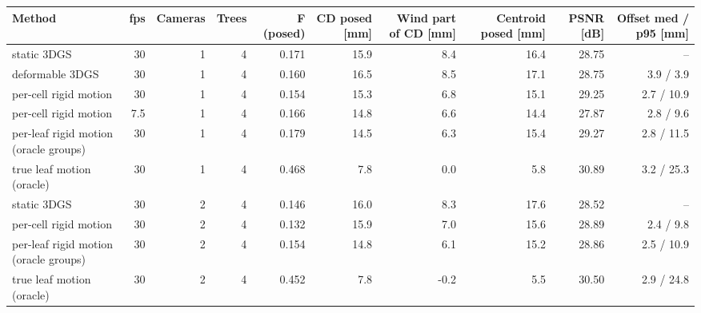 \begin{tabular}{lrrrrrrrrr}
\toprule
Method & fps & Cameras & Trees & F (posed) & CD posed [mm] & Wind part of CD [mm] & Centroid posed [mm] & PSNR [dB] & Offset med / p95 [mm] \\
\midrule
static 3DGS & 30 & 1 & 4 & 0.171 & 15.9 & 8.4 & 16.4 & 28.75 & -- \\
deformable 3DGS & 30 & 1 & 4 & 0.160 & 16.5 & 8.5 & 17.1 & 28.75 & 3.9 / 3.9 \\
per-cell rigid motion & 30 & 1 & 4 & 0.154 & 15.3 & 6.8 & 15.1 & 29.25 & 2.7 / 10.9 \\
per-cell rigid motion & 7.5 & 1 & 4 & 0.166 & 14.8 & 6.6 & 14.4 & 27.87 & 2.8 / 9.6 \\
per-leaf rigid motion (oracle groups) & 30 & 1 & 4 & 0.179 & 14.5 & 6.3 & 15.4 & 29.27 & 2.8 / 11.5 \\
true leaf motion (oracle) & 30 & 1 & 4 & 0.468 & 7.8 & 0.0 & 5.8 & 30.89 & 3.2 / 25.3 \\
\midrule
static 3DGS & 30 & 2 & 4 & 0.146 & 16.0 & 8.3 & 17.6 & 28.52 & -- \\
per-cell rigid motion & 30 & 2 & 4 & 0.132 & 15.9 & 7.0 & 15.6 & 28.89 & 2.4 / 9.8 \\
per-leaf rigid motion (oracle groups) & 30 & 2 & 4 & 0.154 & 14.8 & 6.1 & 15.2 & 28.86 & 2.5 / 10.9 \\
true leaf motion (oracle) & 30 & 2 & 4 & 0.452 & 7.8 & -0.2 & 5.5 & 30.50 & 2.9 / 24.8 \\
\bottomrule
\end{tabular}
